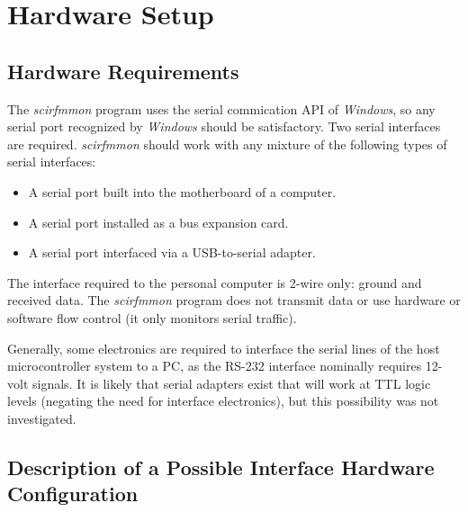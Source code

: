 \documentclass[letterpaper,10pt,titlepage]{article}
\newcommand{\productname}{scirfmmon}
\newcommand{\productnameemph}{\emph{\productname}}
\begin{document}
\section{Hardware Setup}
\label{shsu0}


\subsection{Hardware Requirements}
\label{shsu0:shrq0}

The \productnameemph{} program uses the serial commication API of \emph{Windows}, so any
serial port recognized by \emph{Windows} should be satisfactory.  Two serial interfaces
are required.  \productnameemph{}
should work with any mixture of the following types of serial interfaces:

\begin{itemize}
\item A serial port built into the motherboard of a computer.
\item A serial port installed as a bus expansion card.
\item A serial port interfaced via a USB-to-serial adapter.
\end{itemize}

The interface required to the personal computer is 2-wire only:  ground and
received data.  The \productnameemph{} program does not transmit data or
use hardware or software flow control (it only monitors serial traffic).

Generally, some electronics are required to interface the serial lines of the
host microcontroller system to a PC, as the RS-232
interface nominally requires 12-volt signals.  It is likely that serial adapters
exist that will work at TTL logic levels (negating the need for
interface electronics), but this possibility was not 
investigated.


\subsection{Description of a Possible Interface Hardware Configuration}
\label{shsu0:sdph0}
\end{document}
